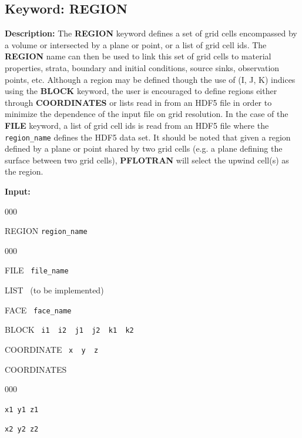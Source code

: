 \documentclass[12pt]{article}
\begin{document}
\hyperlink{target_key}{\return}


\newpage
\protect\hypertarget{target_region}{}


\subsection{Keyword: REGION}

{\noindent\bf Description:}
The {\bf REGION} keyword defines a set of grid cells encompassed by a volume or intersected by a plane or point, or a list of grid cell ids.  The {\bf REGION} name can then be used to link this set of grid cells to material properties, strata, boundary and initial conditions, source sinks, observation points, etc.  Although a region may be defined though the use of (I, J, K) indices using the {\bf BLOCK} keyword, the user is encouraged to define regions either through {\bf COORDINATES} or lists read in from an HDF5 file in order to minimize the dependence of the input file on grid resolution.  In the case of the {\bf FILE} keyword, a list of grid cell ids is read from an HDF5 file where the {\tt region\_name} defines the HDF5 data set.  It should be noted that given a region defined by a plane or point shared by two grid cells (e.g. a plane defining the surface between two grid cells), {\bf PFLOTRAN} will select the upwind cell(s) as the region.

{\noindent\bf Input:}

\begin{deflist}{000}
\item[REGION] {\tt region\_name}
\begin{deflist}{000}
\item[FILE] \ {\tt file\_name}
\item[LIST] \ (to be implemented)
\item[FACE] \ {\tt face\_name}
\item[BLOCK] \ {\tt i1 \ i2 \ j1 \ j2 \ k1 \ k2}
\item[COORDINATE] \ {\tt x \ y \ z}
\item[COORDINATES] ~
\begin{deflist}{000}
\item[\tt x1 y1 z1]
\item[\tt x2 y2 z2]
\end{deflist}
\item[\keyend]
\end{deflist}
\item[\keyend]
\end{deflist}
\end{document}

